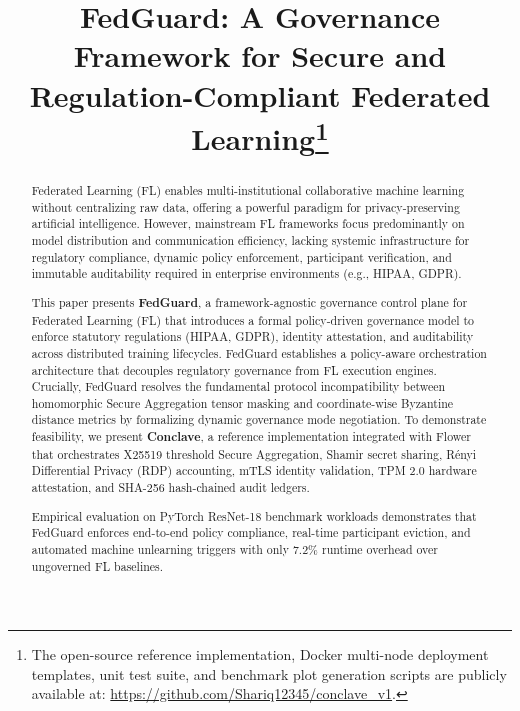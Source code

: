 \documentclass[conference]{IEEEtran}
\begin{document}
\title{FedGuard: A Governance Framework for Secure and Regulation-Compliant Federated Learning\thanks{The open-source reference implementation, Docker multi-node deployment templates, unit test suite, and benchmark plot generation scripts are publicly available at: \url{https://github.com/Shariq12345/conclave_v1}.}\\}

\author{
\and
{}
}

\maketitle

\begin{abstract}
Federated Learning (FL) enables multi-institutional collaborative machine learning without centralizing raw data, offering a powerful paradigm for privacy-preserving artificial intelligence. However, mainstream FL frameworks focus predominantly on model distribution and communication efficiency, lacking systemic infrastructure for regulatory compliance, dynamic policy enforcement, participant verification, and immutable auditability required in enterprise environments (e.g., HIPAA, GDPR).

This paper presents \textbf{FedGuard}, a framework-agnostic governance control plane for Federated Learning (FL) that introduces a formal policy-driven governance model to enforce statutory regulations (HIPAA, GDPR), identity attestation, and auditability across distributed training lifecycles. FedGuard establishes a policy-aware orchestration architecture that decouples regulatory governance from FL execution engines. Crucially, FedGuard resolves the fundamental protocol incompatibility between homomorphic Secure Aggregation tensor masking and coordinate-wise Byzantine distance metrics by formalizing dynamic governance mode negotiation. To demonstrate feasibility, we present \textbf{Conclave}, a reference implementation integrated with Flower that orchestrates X25519 threshold Secure Aggregation, Shamir secret sharing, R\'enyi Differential Privacy (RDP) accounting, mTLS identity validation, TPM 2.0 hardware attestation, and SHA-256 hash-chained audit ledgers.

Empirical evaluation on PyTorch ResNet-18 benchmark workloads demonstrates that FedGuard enforces end-to-end policy compliance, real-time participant eviction, and automated machine unlearning triggers with only 7.2\% runtime overhead over ungoverned FL baselines.
\end{abstract}
\end{document}
